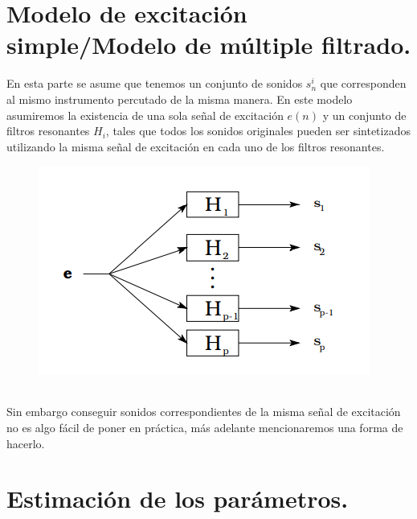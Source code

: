 \documentclass[11pt]{amsart}
\theoremstyle{plain}
\theoremstyle{definition}
\begin{document}
\section{Modelo de excitación simple/Modelo de múltiple filtrado.}
En esta parte se asume que tenemos un conjunto de sonidos $s_n^i$ que corresponden al mismo instrumento percutado de la misma manera.
En este modelo asumiremos la existencia de una sola señal de excitación $e(n)$ y un conjunto de filtros resonantes $H_i$, tales que todos los sonidos originales pueden ser sintetizados utilizando la misma señal de excitación en cada uno de los filtros resonantes. \\
\begin{figure}
\includegraphics[scale=1]{grafo1.png}
\end{figure}
\\
Sin embargo conseguir sonidos correspondientes de la misma señal de excitación no es algo fácil de poner en práctica, más adelante mencionaremos una forma de hacerlo. \\
\section{Estimación de los parámetros.}
\end{document}
